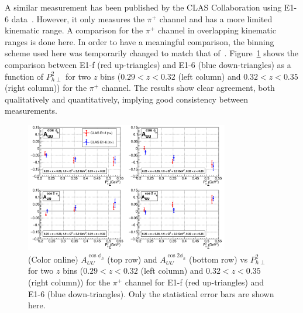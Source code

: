 \documentclass[aps,prl,twocolumn,showpacs,superscriptaddress,groupedaddress]{revtex4-1}  %
\newcommand{\Phperp}{P_{h\perp}}
\begin{document}
A similar measurement has been published by the CLAS Collaboration using \mbox{E1-6} data~\cite{Osipenko:2008rv}.
However, it only measures the $\pi^+$ channel and has a more limited kinematic range.
A comparison for the $\pi^+$ channel in overlapping kinematic ranges is done here.
In order to have a meaningful comparison, the binning scheme used here was temporarily changed to match that of~\cite{Osipenko:2008rv}.
Figure~\ref{fig:osipenkoComparisonVPT2_2zBins} shows the comparison between E1-f (red up-triangles) and E1-6 (blue down-triangles) as a function of $\Phperp^2$ for two $z$ bins ($0.29 < z < 0.32$ (left column) and $0.32 < z < 0.35$ (right column)) for the $\pi^+$ channel.
The results show clear agreement, both qualitatively and quantitatively, implying good consistency between measurements.
%
\begin{figure}[htp]
\centering
\includegraphics[width=3.5in]{plots/osipenkoComparisonVPT2_2zBins.png}
\caption{(Color online) $A_{UU}^{\cos \phi_h}$ (top row) and $A_{UU}^{\cos 2\phi_h}$ (bottom row) vs $P_{h\perp}^2$ for two $z$ bins ($0.29 < z < 0.32$ (left column) and $0.32 < z < 0.35$ (right column)) for the $\pi^+$ channel for E1-f (red up-triangles) and E1-6 (blue down-triangles). Only the statistical error bars are shown here.}
\label{fig:osipenkoComparisonVPT2_2zBins}
\end{figure}
\end{document}
